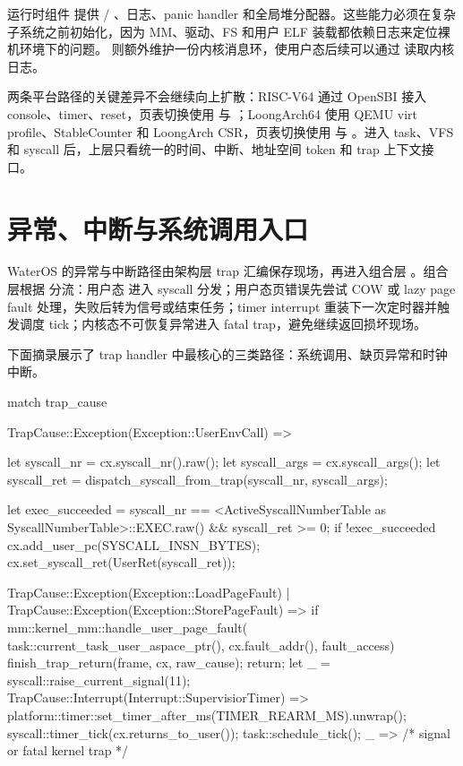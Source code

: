 运行时组件  提供  / 、日志、panic handler 和全局堆分配器。这些能力必须在复杂子系统之前初始化，因为 MM、驱动、FS 和用户 ELF 装载都依赖日志来定位裸机环境下的问题。 则额外维护一份内核消息环，使用户态后续可以通过  读取内核日志。

两条平台路径的关键差异不会继续向上扩散：RISC-V64 通过 OpenSBI 接入 console、timer、reset，页表切换使用  与 ；LoongArch64 使用 QEMU virt profile、StableCounter 和 LoongArch CSR，页表切换使用  与 。进入 task、VFS 和 syscall 后，上层只看统一的时间、中断、地址空间 token 和 trap 上下文接口。

\section{异常、中断与系统调用入口}

WaterOS 的异常与中断路径由架构层 trap 汇编保存现场，再进入组合层 。组合层根据  分流：用户态  进入 syscall 分发；用户态页错误先尝试 COW 或 lazy page fault 处理，失败后转为信号或结束任务；timer interrupt 重装下一次定时器并触发调度 tick；内核态不可恢复异常进入 fatal trap，避免继续返回损坏现场。

下面摘录展示了 trap handler 中最核心的三类路径：系统调用、缺页异常和时钟中断。

\begin{rustcode}
match trap_cause {
    TrapCause::Exception(Exception::UserEnvCall) => {
        let syscall_nr = cx.syscall_nr().raw();
        let syscall_args = cx.syscall_args();
        let syscall_ret = dispatch_syscall_from_trap(syscall_nr, syscall_args);

        let exec_succeeded = syscall_nr ==
            <ActiveSyscallNumberTable as SyscallNumberTable>::EXEC.raw()
            && syscall_ret >= 0;
        if !exec_succeeded {
            cx.add_user_pc(SYSCALL_INSN_BYTES);
            cx.set_syscall_ret(UserRet(syscall_ret));
        }
    }
    TrapCause::Exception(Exception::LoadPageFault)
    | TrapCause::Exception(Exception::StorePageFault) => {
        if mm::kernel_mm::handle_user_page_fault(
            task::current_task_user_aspace_ptr(),
            cx.fault_addr(), fault_access) {
            finish_trap_return(frame, cx, raw_cause);
            return;
        }
        let _ = syscall::raise_current_signal(11);
    }
    TrapCause::Interrupt(Interrupt::SupervisiorTimer) => {
        platform::timer::set_timer_after_ms(TIMER_REARM_MS).unwrap();
        syscall::timer_tick(cx.returns_to_user());
        task::schedule_tick();
    }
    _ => { /* signal or fatal kernel trap */ }
}
\end{rustcode}


